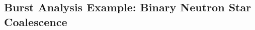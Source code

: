 \documentclass{beamer}
\begin{document}
\begin{frame}
\end{frame}

%

\subsection{Burst Analysis Example: Binary Neutron Star Coalescence}


\begin{frame}
    \tableofcontents[currentsection]
\end{frame}
\end{document}
